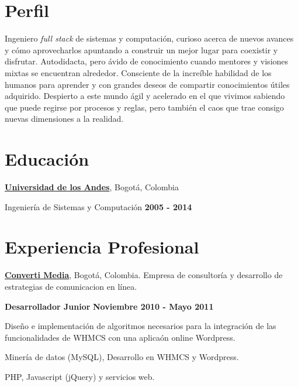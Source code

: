 \section{Perfil}
%
Ingeniero \textit{full stack} de sistemas y computación, curioso acerca de
nuevos avances y cómo aprovecharlos apuntando a construir un mejor lugar para coexistir y disfrutar. 
Autodidacta, pero ávido de conocimiento cuando mentores y visiones mixtas se encuentran alrededor. 
Consciente de la increíble habilidad de los humanos para aprender y con grandes
deseos de compartir conocimientos útiles adquirido.
Despierto a este mundo ágil y acelerado en el que vivimos sabiendo que puede regirse por procesos y reglas, 
pero también el caos que trae consigo nuevas dimensiones a la realidad.

\section{Educaci\'on}
%
\href{http://www.uniandes.edu.co/}{\textbf{Universidad de los Andes}},
Bogot\'{a}, Colombia
\begin{outerlist}
\item[] Ingenier\'ia de Sistemas y Computaci\'on \hfill \textbf{2005 - 2014}
\end{outerlist}

\section{Experiencia Profesional}
%
\href{http://convertimedia.com/}{\textbf{Converti Media}}, Bogot\'a, Colombia.
Empresa de consultor\'ia y desarrollo de estrategias de comunicacion en l\'inea.
\begin{outerlist}
\item[] \textbf{Desarrollador Junior} \hfill \textbf{Noviembre 2010 - Mayo 2011}
    \begin{innerlist}
    	\item Dise\~no e implementaci\'on de algoritmos necesarios para la
    	integraci\'on de las funcionalidades de WHMCS con una aplica\'on online
    	Wordpress.
		\item Miner\'ia de datos (MySQL), Desarrollo en WHMCS y Wordpress.
		\item PHP, Javascript (jQuery) y servicios web.
    \end{innerlist}
\end{outerlist}

